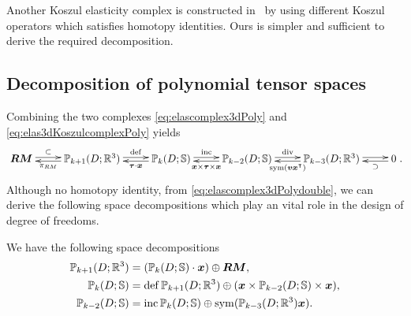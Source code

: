 \begin{remark}
 Another Koszul elasticity complex is constructed in~\cite[Section~3.2]{ChristiansenHuSande2020} by using different Koszul operators which satisfies homotopy identities. Ours is simpler and sufficient to derive the required decomposition.    
\end{remark}
%

\subsection{Decomposition of polynomial tensor spaces}

Combining the two complexes \eqref{eq:elascomplex3dPoly} and \eqref{eq:elas3dKoszulcomplexPoly} yields
\begin{equation}\label{eq:elascomplex3dPolydouble}
\xymatrix{
\boldsymbol{RM}\ar@<0.4ex>[r]^-{\subset} & \mathbb P_{k+1}(D;\mathbb R^3)\ar@<0.4ex>[r]^-{\defm}\ar@<0.4ex>[l]^-{\pi_{RM}} & \mathbb P_{k}(D;\mathbb S)\ar@<0.4ex>[r]^-{\inc}\ar@<0.4ex>[l]^-{\boldsymbol\tau\cdot \boldsymbol x}  & \mathbb P_{k-2}(D;\mathbb S) \ar@<0.4ex>[r]^-{{\div}}\ar@<0.4ex>[l]^-{\boldsymbol x\times\boldsymbol\tau \times \boldsymbol x} & \mathbb P_{k-3}(D;\mathbb R^3)  \ar@<0.4ex>[r]^-{} \ar@<0.4ex>[l]^-{\sym(\boldsymbol v \boldsymbol x^{\intercal})}
& 0 \ar@<0.4ex>[l]^-{\supset} }.
\end{equation}
Although no homotopy identity, from \eqref{eq:elascomplex3dPolydouble}, we can derive the following space decompositions which play an vital role in the design of degree of freedoms. 
\begin{lemma}
We have the following space decompositions
\begin{align}
\label{eq:polydecomp0}
\mathbb P_{k+1}(D;\mathbb R^3)&=(\mathbb P_k(D;\mathbb S)\cdot \boldsymbol x)\oplus\boldsymbol{RM},\\
\label{eq:polydecomp1}
\mathbb P_k(D;\mathbb S ) &=\operatorname{def}\mathbb P_{k+1}(D;\mathbb R^3)\oplus(\boldsymbol x\times\mathbb P_{k-2}(D;\mathbb S)\times \boldsymbol  x),\\
\label{eq:polydecomp2}
\mathbb P_{k-2}(D;\mathbb S)&=\operatorname{inc} \mathbb P_k(D;\mathbb S)\oplus \operatorname{sym}(\mathbb P_{k-3}(D;\mathbb R^3)\boldsymbol  x).
\end{align}
\end{lemma}
